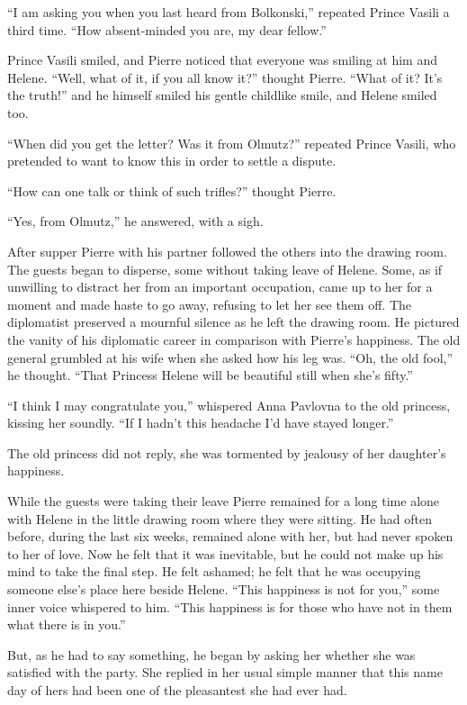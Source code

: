 ``I am asking you when you last heard from Bolkonski,'' repeated
Prince Vasili a third time. ``How absent-minded you are, my dear
fellow.''

Prince Vasili smiled, and Pierre noticed that everyone was
smiling at him and Helene. ``Well, what of it, if you all know
it?'' thought Pierre.  ``What of it? It's the truth!'' and he
himself smiled his gentle childlike smile, and Helene smiled too.

``When did you get the letter? Was it from Olmutz?'' repeated
Prince Vasili, who pretended to want to know this in order to
settle a dispute.

``How can one talk or think of such trifles?'' thought Pierre.

``Yes, from Olmutz,'' he answered, with a sigh.

After supper Pierre with his partner followed the others into the
drawing room. The guests began to disperse, some without taking
leave of Helene. Some, as if unwilling to distract her from an
important occupation, came up to her for a moment and made haste
to go away, refusing to let her see them off. The diplomatist
preserved a mournful silence as he left the drawing room. He
pictured the vanity of his diplomatic career in comparison with
Pierre's happiness. The old general grumbled at his wife when she
asked how his leg was. ``Oh, the old fool,'' he thought. ``That
Princess Helene will be beautiful still when she's fifty.''

``I think I may congratulate you,'' whispered Anna Pavlovna to
the old princess, kissing her soundly. ``If I hadn't this
headache I'd have stayed longer.''

The old princess did not reply, she was tormented by jealousy of
her daughter's happiness.

While the guests were taking their leave Pierre remained for a
long time alone with Helene in the little drawing room where they
were sitting. He had often before, during the last six weeks,
remained alone with her, but had never spoken to her of love. Now
he felt that it was inevitable, but he could not make up his mind
to take the final step. He felt ashamed; he felt that he was
occupying someone else's place here beside Helene. ``This
happiness is not for you,'' some inner voice whispered to
him. ``This happiness is for those who have not in them what
there is in you.''

But, as he had to say something, he began by asking her whether
she was satisfied with the party. She replied in her usual simple
manner that this name day of hers had been one of the pleasantest
she had ever had.


